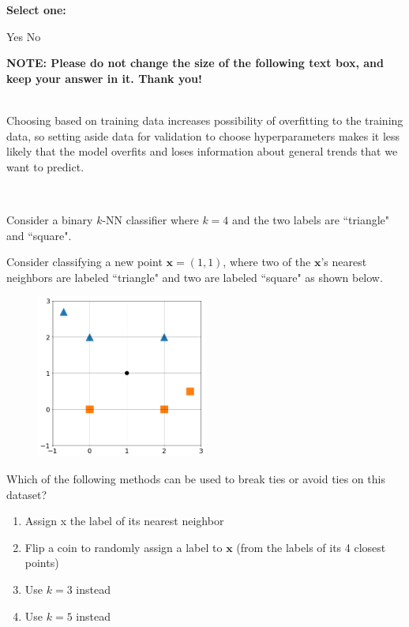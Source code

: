 \documentclass[11pt,addpoints,answers]{exam}
\numberwithin{equation}{section} %
\numberwithin{figure}{section} %
\numberwithin{table}{section} %
\newcommand{\xv}{\mathbf{x}}
\begin{document}
\begin{questions}
\begin{parts}
    \textbf{Select one:}
    \begin{checkboxes}
        \CorrectChoice Yes
        \choice No
    \end{checkboxes}

    \textbf{NOTE: Please do not change the size of the following text box, and keep your answer in it. Thank you!} \\ \\
    \begin{tcolorbox}[fit,height=4cm, width=15cm, blank, borderline={1pt}{-2pt},nobeforeafter, top=2pt, left=2pt, right=2pt, bottom=2pt]
    \large
    Choosing based on training data increases possibility of overfitting to the training data, so setting aside data for validation to choose hyperparameters makes it less likely that the model overfits and loses information about general trends that we want to predict. 

    \end{tcolorbox} \\

    \end{parts}
    
    
    \question[3] Consider a binary $k$-NN classifier where $k=4$ and the two labels are ``triangle" and ``square".
    
    Consider classifying a new point $\xv =(1,1)$, where two of the $\xv$'s nearest neighbors are labeled ``triangle" and two are labeled ``square" as shown below.
    
    \begin{figure}[H]
        \centering
        \includegraphics[width = 0.5\textwidth]{1-1-5.png}
        \label{Q_5knn}
    \end{figure}
    
    Which of the following methods can be used to break ties or avoid ties on this dataset?
    
    \begin{enumerate}
        \item Assign x the label of its nearest neighbor
        \item Flip a coin to randomly assign a label to $\xv$ (from the labels of its 4 closest points)
        \item Use $k = 3$ instead
        \item Use $k = 5$ instead
    \end{enumerate}


\end{questions}
\end{document}
